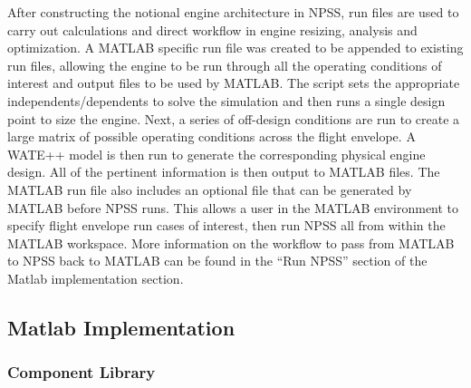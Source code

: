\documentclass[heading.tex]{subfiles}
\begin{document}
After constructing the notional engine architecture in NPSS, run files are used to carry out calculations and direct workflow in engine resizing, analysis and optimization. A MATLAB specific run file was created to be appended to existing run files, allowing the engine to be run through all the operating conditions of interest and output files to be used by MATLAB. The script sets the appropriate independents/dependents to solve the simulation and then runs a single design point to size the engine. Next, a series of off-design conditions are run to create a large matrix of possible operating conditions across the flight envelope. A WATE++ model is then run to generate the corresponding physical engine design. All of the pertinent information is then output to MATLAB files. The MATLAB run file also includes an optional file that can be generated by MATLAB before NPSS runs. This allows a user in the MATLAB environment to specify flight envelope run cases of interest, then run NPSS all from within the MATLAB workspace. More information on the workflow to pass from MATLAB to NPSS back to MATLAB can be found in the “Run NPSS” section of the Matlab implementation section.

\subsection{Matlab Implementation}

\subsubsection{Component Library}
\end{document}
